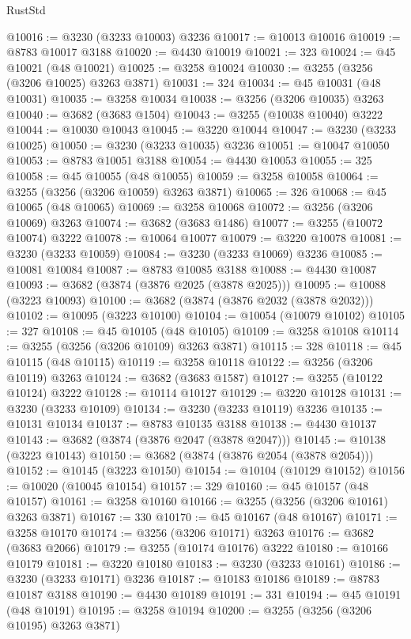 \begin{lexlean}{RustStd}
\begin{coremodule}
{\begin{coremodule}
{{{{{{{{{{{{{{{{{{{{{{{{{{{{{{{{{{{{{@10016 := @3230 (@3233 @10003) @3236
@10017 := @10013 @10016
@10019 := @8783 @10017 @3188
@10020 := @4430 @10019
@10021 := 323
@10024 := @45 @10021 (@48 @10021)
@10025 := @3258 @10024
@10030 := @3255 (@3256 (@3206 @10025) @3263 @3871)
@10031 := 324
@10034 := @45 @10031 (@48 @10031)
@10035 := @3258 @10034
@10038 := @3256 (@3206 @10035) @3263
@10040 := @3682 (@3683 @1504)
@10043 := @3255 (@10038 @10040) @3222
@10044 := @10030 @10043
@10045 := @3220 @10044
@10047 := @3230 (@3233 @10025)
@10050 := @3230 (@3233 @10035) @3236
@10051 := @10047 @10050
@10053 := @8783 @10051 @3188
@10054 := @4430 @10053
@10055 := 325
@10058 := @45 @10055 (@48 @10055)
@10059 := @3258 @10058
@10064 := @3255 (@3256 (@3206 @10059) @3263 @3871)
@10065 := 326
@10068 := @45 @10065 (@48 @10065)
@10069 := @3258 @10068
@10072 := @3256 (@3206 @10069) @3263
@10074 := @3682 (@3683 @1486)
@10077 := @3255 (@10072 @10074) @3222
@10078 := @10064 @10077
@10079 := @3220 @10078
@10081 := @3230 (@3233 @10059)
@10084 := @3230 (@3233 @10069) @3236
@10085 := @10081 @10084
@10087 := @8783 @10085 @3188
@10088 := @4430 @10087
@10093 := @3682 (@3874 (@3876 @2025 (@3878 @2025)))
@10095 := @10088 (@3223 @10093)
@10100 := @3682 (@3874 (@3876 @2032 (@3878 @2032)))
@10102 := @10095 (@3223 @10100)
@10104 := @10054 (@10079 @10102)
@10105 := 327
@10108 := @45 @10105 (@48 @10105)
@10109 := @3258 @10108
@10114 := @3255 (@3256 (@3206 @10109) @3263 @3871)
@10115 := 328
@10118 := @45 @10115 (@48 @10115)
@10119 := @3258 @10118
@10122 := @3256 (@3206 @10119) @3263
@10124 := @3682 (@3683 @1587)
@10127 := @3255 (@10122 @10124) @3222
@10128 := @10114 @10127
@10129 := @3220 @10128
@10131 := @3230 (@3233 @10109)
@10134 := @3230 (@3233 @10119) @3236
@10135 := @10131 @10134
@10137 := @8783 @10135 @3188
@10138 := @4430 @10137
@10143 := @3682 (@3874 (@3876 @2047 (@3878 @2047)))
@10145 := @10138 (@3223 @10143)
@10150 := @3682 (@3874 (@3876 @2054 (@3878 @2054)))
@10152 := @10145 (@3223 @10150)
@10154 := @10104 (@10129 @10152)
@10156 := @10020 (@10045 @10154)
@10157 := 329
@10160 := @45 @10157 (@48 @10157)
@10161 := @3258 @10160
@10166 := @3255 (@3256 (@3206 @10161) @3263 @3871)
@10167 := 330
@10170 := @45 @10167 (@48 @10167)
@10171 := @3258 @10170
@10174 := @3256 (@3206 @10171) @3263
@10176 := @3682 (@3683 @2066)
@10179 := @3255 (@10174 @10176) @3222
@10180 := @10166 @10179
@10181 := @3220 @10180
@10183 := @3230 (@3233 @10161)
@10186 := @3230 (@3233 @10171) @3236
@10187 := @10183 @10186
@10189 := @8783 @10187 @3188
@10190 := @4430 @10189
@10191 := 331
@10194 := @45 @10191 (@48 @10191)
@10195 := @3258 @10194
@10200 := @3255 (@3256 (@3206 @10195) @3263 @3871)
}}}}}}}}}}}}}}}}}}}}}}}}}}}}}}}}}}}}}
\end{coremodule}}
\end{coremodule}
\end{lexlean}
